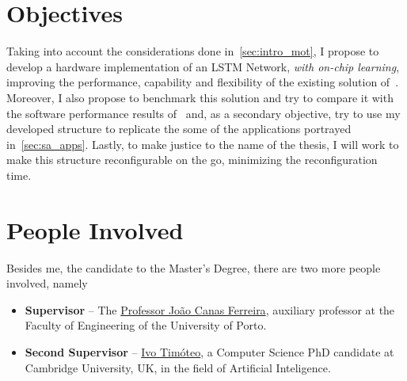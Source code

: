\section{Objectives}\label{sec:intro_obj}
Taking into account the considerations done in~\ref{sec:intro_mot}, I propose to develop a hardware implementation of an LSTM Network, \emph{with on-chip learning}, improving the performance, capability and flexibility of the existing solution of~\cite{Chang15}. Moreover, I also propose to benchmark this solution and try to compare it with the software performance results of~\cite{Tavear13} and, as a secondary objective, try to use my developed structure to replicate the some of the applications portrayed in~\ref{sec:sa_apps}. Lastly, to make justice to the name of the thesis, I will work to make this structure reconfigurable on the go, minimizing the reconfiguration time.

\section{People Involved}\label{sec:intro_people}
Besides me, the candidate to the Master's Degree, there are two more people involved, namely

\begin{itemize}
    \item \textbf{Supervisor} -- The \href{https://sigarra.up.pt/feup/pt/func\_geral.formview?p\_codigo=210963}{Professor João Canas Ferreira}, auxiliary professor at the Faculty of Engineering of the University of Porto.
    \item \textbf{Second Supervisor} -- \href{http://www.cl.cam.ac.uk/~ijpdmt2/}{Ivo Timóteo}, a Computer Science PhD candidate at Cambridge University, UK, in the field of Artificial Inteligence.
\end{itemize}

